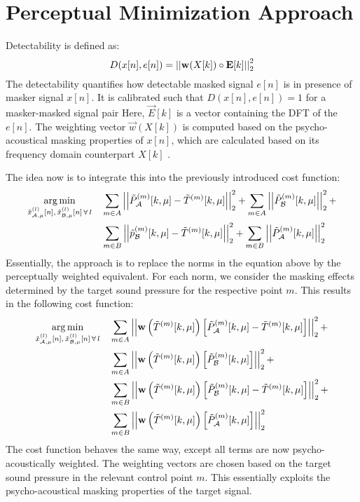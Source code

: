 \section{Perceptual Minimization Approach}
Detectability is defined as: 
\begin{equation}
    D(x[n],e[n]) = \norm[2][2]{\vec{w}(X[k]) \circ \vec{E}[k]}     
\end{equation}
The detectability quantifies how detectable masked signal $e[n]$ is in presence of masker signal $x[n]$.  
It is calibrated such that $D(x[n],e[n]) = 1$ for a masker-masked signal pair
Here, $\vec{E}[k]$ is a vector containing the DFT of the $e[n]$.
The weighting vector $\vec{w}(X[k])$ is computed based on the psycho-acoustical masking properties of $x[n]$,
which are calculated based on its frequency domain counterpart $X[k]$ . 

The idea now is to integrate this into the previously introduced cost function:
\begin{align}
    \argmin{\tilde{x}_{\za,\mu}^{(l)}[n],\,\tilde{x}_{\zb,\mu}^{(l)}[n]\,\forall\,l}{
       &\sum_{m\in A} \norm[2][2]{\tilde{P}_{\za}^{(m)}[k,\mu] - \tilde{T}^{(m)}[k,\mu]} +
        \sum_{m\in A} \norm[2][2]{\tilde{P}_{\zb}^{(m)}[k,\mu]} + \\
       &\sum_{m\in B} \norm[2][2]{\tilde{p}_{\zb}^{(m)}[k,\mu] - \tilde{T}^{(m)}[k,\mu]} + 
        \sum_{m\in B} \norm[2][2]{\tilde{P}_{\za}^{(m)}[k,\mu]}
    }
\end{align}
Essentially, the approach is to replace the norms in the equation above by the perceptually weighted equivalent.
For each norm, we consider the masking effects determined by the target sound pressure for the respective point $m$. 
This results in the following cost function:
\begin{align}
    \argmin{\tilde{x}_{\za,\mu}^{(l)}[n],\,\tilde{x}_{\zb,\mu}^{(l)}[n]\,\forall\,l}{
       &\sum_{m\in A} \norm[2][2]{
        \vec{w}\left(\tilde{T}^{(m)}[k,\mu]\right)\left[\tilde{P}_{\za}^{(m)}[k,\mu] - \tilde{T}^{(m)}[k,\mu]\right]} + \\
       &\sum_{m\in A} \norm[2][2]{\vec{w}\left(\tilde{T}^{(m)}[k,\mu]\right)
        \left[\tilde{P}_{\zb}^{(m)}[k,\mu]\right]} + \\
       &\sum_{m\in B} \norm[2][2]{\vec{w}\left(\tilde{T}^{(m)}[k,\mu]\right)
        \left[\tilde{P}_{\zb}^{(m)}[k,\mu] - \tilde{T}^{(m)}[k,\mu]\right]} + \\
       &\sum_{m\in B} \norm[2][2]{\vec{w}\left(\tilde{T}^{(m)}[k,\mu]\right)
        \left[\tilde{P}_{\za}^{(m)}[k,\mu]\right]}
    }
\end{align}
The cost function behaves the same way, except all terms are now psycho-acoustically weighted.
The weighting vectors are chosen based on the target sound pressure in the relevant control point $m$.
This essentially exploits the psycho-acoustical masking properties of the target signal.
